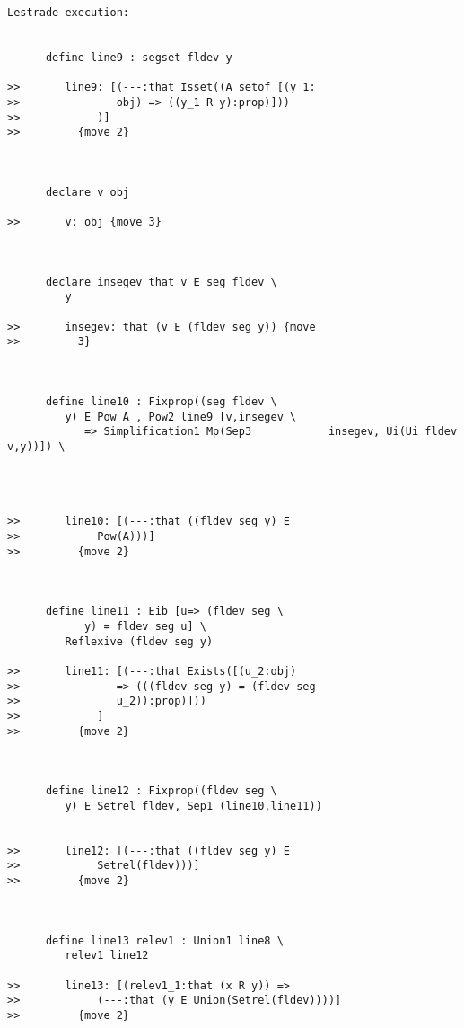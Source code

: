 \documentclass{article}
\begin{document}
\begin{verbatim}Lestrade execution:


      define line9 : segset fldev y

>>       line9: [(---:that Isset((A setof [(y_1:
>>               obj) => ((y_1 R y):prop)]))
>>            )]
>>         {move 2}



      declare v obj

>>       v: obj {move 3}



      declare insegev that v E seg fldev \
         y

>>       insegev: that (v E (fldev seg y)) {move
>>         3}



      define line10 : Fixprop((seg fldev \
         y) E Pow A , Pow2 line9 [v,insegev \
            => Simplification1 Mp(Sep3            insegev, Ui(Ui fldev v,y))]) \
         



>>       line10: [(---:that ((fldev seg y) E
>>            Pow(A)))]
>>         {move 2}



      define line11 : Eib [u=> (fldev seg \
            y) = fldev seg u] \
         Reflexive (fldev seg y)

>>       line11: [(---:that Exists([(u_2:obj)
>>               => (((fldev seg y) = (fldev seg
>>               u_2)):prop)]))
>>            ]
>>         {move 2}



      define line12 : Fixprop((fldev seg \
         y) E Setrel fldev, Sep1 (line10,line11))


>>       line12: [(---:that ((fldev seg y) E
>>            Setrel(fldev)))]
>>         {move 2}



      define line13 relev1 : Union1 line8 \
         relev1 line12

>>       line13: [(relev1_1:that (x R y)) =>
>>            (---:that (y E Union(Setrel(fldev))))]
>>         {move 2}


\end{verbatim}
\end{document}
